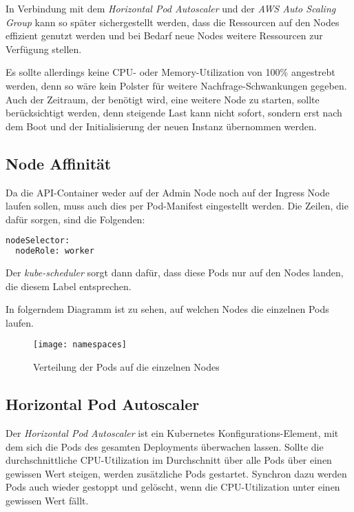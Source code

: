 In Verbindung mit dem \emph{Horizontal Pod Autoscaler} und
der \emph{AWS Auto Scaling Group}
kann so später sichergestellt werden, dass die Ressourcen auf den Nodes
effizient genutzt werden und bei Bedarf neue Nodes weitere
Ressourcen zur Verfügung stellen.

Es sollte allerdings keine CPU- oder Memory-Utilization von 100\% angestrebt werden,
denn so wäre kein Polster für weitere Nachfrage-Schwankungen gegeben.
Auch der Zeitraum, der benötigt wird, eine weitere Node zu starten, sollte
berücksichtigt werden, denn steigende Last kann nicht sofort, sondern erst
nach dem Boot und der Initialisierung der neuen Instanz
übernommen werden.

\subsection{Node Affinität}

Da die API-Container weder auf der Admin Node noch auf der Ingress Node
laufen sollen, muss auch dies per Pod-Manifest eingestellt werden.
Die Zeilen, die dafür sorgen, sind die Folgenden:

\begin{lstlisting}[language=Python,numbers=none]
nodeSelector:
  nodeRole: worker\end{lstlisting}

Der \emph{kube-scheduler} sorgt dann dafür, dass diese Pods nur auf den Nodes
landen, die diesem Label entsprechen.

In folgerndem Diagramm ist zu sehen, auf welchen Nodes die einzelnen Pods laufen.

\begin{figure}[H]
\centering
\texttt{[image: namespaces]}
\caption{Verteilung der Pods auf die einzelnen Nodes}
\end{figure}

\subsection{Horizontal Pod Autoscaler}

Der \emph{Horizontal Pod Autoscaler} ist ein Kubernetes Konfigurations-Element, mit dem
sich die Pods des gesamten Deployments überwachen lassen. Sollte die
durchschnittliche CPU-Utilization im Durchschnitt über alle Pods über
einen gewissen Wert steigen, werden zusätzliche Pods gestartet. Synchron dazu
werden Pods auch wieder gestoppt und gelöscht, wenn die CPU-Utilization unter
einen gewissen Wert fällt.

